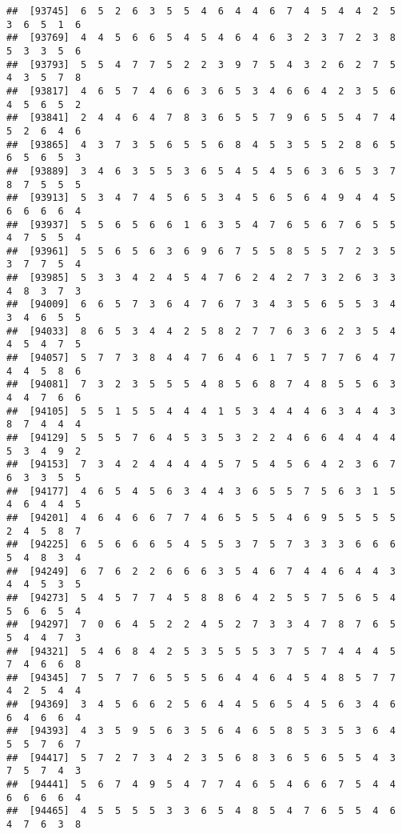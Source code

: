 \documentclass[
]{book}
\begin{document}
\begin{verbatim}
##  [93745]  6  5  2  6  3  5  5  4  6  4  4  6  7  4  5  4  4  2  5  3  6  5  1  6
##  [93769]  4  4  5  6  6  5  4  5  4  6  4  6  3  2  3  7  2  3  8  5  3  3  5  6
##  [93793]  5  5  4  7  7  5  2  2  3  9  7  5  4  3  2  6  2  7  5  4  3  5  7  8
##  [93817]  4  6  5  7  4  6  6  3  6  5  3  4  6  6  4  2  3  5  6  4  5  6  5  2
##  [93841]  2  4  4  6  4  7  8  3  6  5  5  7  9  6  5  5  4  7  4  5  2  6  4  6
##  [93865]  4  3  7  3  5  6  5  5  6  8  4  5  3  5  5  2  8  6  5  6  5  6  5  3
##  [93889]  3  4  6  3  5  5  3  6  5  4  5  4  5  6  3  6  5  3  7  8  7  5  5  5
##  [93913]  5  3  4  7  4  5  6  5  3  4  5  6  5  6  4  9  4  4  5  6  6  6  6  4
##  [93937]  5  5  6  5  6  6  1  6  3  5  4  7  6  5  6  7  6  5  5  4  7  5  5  4
##  [93961]  5  5  6  5  6  3  6  9  6  7  5  5  8  5  5  7  2  3  5  3  7  7  5  4
##  [93985]  5  3  3  4  2  4  5  4  7  6  2  4  2  7  3  2  6  3  3  4  8  3  7  3
##  [94009]  6  6  5  7  3  6  4  7  6  7  3  4  3  5  6  5  5  3  4  3  4  6  5  5
##  [94033]  8  6  5  3  4  4  2  5  8  2  7  7  6  3  6  2  3  5  4  4  5  4  7  5
##  [94057]  5  7  7  3  8  4  4  7  6  4  6  1  7  5  7  7  6  4  7  4  4  5  8  6
##  [94081]  7  3  2  3  5  5  5  4  8  5  6  8  7  4  8  5  5  6  3  4  4  7  6  6
##  [94105]  5  5  1  5  5  4  4  4  1  5  3  4  4  4  6  3  4  4  3  8  7  4  4  4
##  [94129]  5  5  5  7  6  4  5  3  5  3  2  2  4  6  6  4  4  4  4  5  3  4  9  2
##  [94153]  7  3  4  2  4  4  4  4  5  7  5  4  5  6  4  2  3  6  7  6  3  3  5  5
##  [94177]  4  6  5  4  5  6  3  4  4  3  6  5  5  7  5  6  3  1  5  4  6  4  4  5
##  [94201]  4  6  4  6  6  7  7  4  6  5  5  5  4  6  9  5  5  5  5  2  4  5  8  7
##  [94225]  6  5  6  6  6  5  4  5  5  3  7  5  7  3  3  3  6  6  6  5  4  8  3  4
##  [94249]  6  7  6  2  2  6  6  6  3  5  4  6  7  4  4  6  4  4  3  4  4  5  3  5
##  [94273]  5  4  5  7  7  4  5  8  8  6  4  2  5  5  7  5  6  5  4  5  6  6  5  4
##  [94297]  7  0  6  4  5  2  2  4  5  2  7  3  3  4  7  8  7  6  5  5  4  4  7  3
##  [94321]  5  4  6  8  4  2  5  3  5  5  5  3  7  5  7  4  4  4  5  7  4  6  6  8
##  [94345]  7  5  7  7  6  5  5  5  6  4  4  6  4  5  4  8  5  7  7  4  2  5  4  4
##  [94369]  3  4  5  6  6  2  5  6  4  4  5  6  5  4  5  6  3  4  6  6  4  6  6  4
##  [94393]  4  3  5  9  5  6  3  5  6  4  6  5  8  5  3  5  3  6  4  5  5  7  6  7
##  [94417]  5  7  2  7  3  4  2  3  5  6  8  3  6  5  6  5  5  4  3  7  5  7  4  3
##  [94441]  5  6  7  4  9  5  4  7  7  4  6  5  4  6  6  7  5  4  4  6  6  6  6  4
##  [94465]  4  5  5  5  5  3  3  6  5  4  8  5  4  7  6  5  5  4  6  4  7  6  3  8

\end{verbatim}
\end{document}
